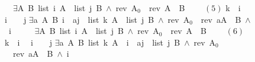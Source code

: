 \documentclass[twoside,runningheads,envcountsame,envcountsect,oribibl,orivec]{llncs}
\begin{document}
\begin{figure}
\begin{isabellebody}
\ \ $\exists$A\ B{\isachardot}\ {\isacharparenleft}list\ {\isacharbackquote}i\ A\ {\isacharasterisk}\ list\ {\isacharbackquote}j\ B{\isacharparenright}\ $\wedge$\ {\isacharparenleft}rev\ A$_0${\isacharparenright}\ {\isacharequal}\ {\isacharparenleft}rev\ A{\isacharparenright}\ {\isacharat}\ B\ {\isasymrbrakk}
\isanewline\ \ \ {\isasymsqsubseteq}\hfill $(5)$\isanewline
{\isacharbackquote}k\ {\isacharcolon}{\isacharequal}\ {\isacharat}{\isacharparenleft}{\isacharbackquote}i\ {\isacharplus}\ {}{\isacharparenright}{\isacharsemicolon}\isanewline
{\isacharat}{\isacharparenleft}{\isacharbackquote}i\ {\isacharplus}\ {}{\isacharparenright}\ {\isacharcolon}{\isacharequal}\ {\isacharbackquote}j{\isacharsemicolon}\isanewline
{\isasymlbrakk}{\isacharparenleft}$\exists$a\ A\ B{\isachardot}\ {\isacharparenleft}{\isacharbackquote}i\ {\isacharbrackleft}{\isasymmapsto}{\isacharbrackright}\ {\isacharbrackleft}a{\isacharcomma}{\isacharbackquote}j{\isacharbrackright}\ {\isacharasterisk}\ list\ {\isacharbackquote}k\ A\ {\isacharasterisk}\ list\ {\isacharbackquote}j\ B{\isacharparenright}\ $\wedge$\ {\isacharparenleft}rev\ A$_0${\isacharparenright}\ {\isacharequal}\ {\isacharparenleft}rev\ {\isacharparenleft}a{\isacharhash}A{\isacharparenright}{\isacharparenright}\ {\isacharat}\ B{\isacharparenright}\ $\wedge$\ {\isacharbackquote}i\ {\isasymnoteq}\ {}{\isacharcomma}\ \isanewline
\ \ $\exists$A\ B{\isachardot}\ {\isacharparenleft}list\ {\isacharbackquote}i\ A\ {\isacharasterisk}\ list\ {\isacharbackquote}j\ B{\isacharparenright}\ $\wedge$\ {\isacharparenleft}rev\ A$_0${\isacharparenright}\ {\isacharequal}\ {\isacharparenleft}rev\ A{\isacharparenright}\ {\isacharat}\ B\ {\isasymrbrakk}
\isanewline\ \ \ {\isasymsqsubseteq}\hfill $(6)$\isanewline
{\isacharbackquote}k\ {\isacharcolon}{\isacharequal}\ {\isacharat}{\isacharparenleft}{\isacharbackquote}i\ {\isacharplus}\ {}{\isacharparenright}{\isacharsemicolon}\isanewline
{\isacharat}{\isacharparenleft}{\isacharbackquote}i\ {\isacharplus}\ {}{\isacharparenright}\ {\isacharcolon}{\isacharequal}\ {\isacharbackquote}j{\isacharsemicolon}\isanewline
{\isasymlbrakk}{\isacharparenleft}$\exists$a\ A\ B{\isachardot}\ {\isacharparenleft}list\ {\isacharbackquote}k\ A\ {\isacharasterisk}\ {\isacharbackquote}i\ {\isacharbrackleft}{\isasymmapsto}{\isacharbrackright}\ {\isacharbrackleft}a{\isacharcomma}{\isacharbackquote}j{\isacharbrackright}\ {\isacharasterisk}\ list\ {\isacharbackquote}j\ B{\isacharparenright}\ $\wedge$\ {\isacharparenleft}rev\ A$_0${\isacharparenright}\ {\isacharequal}\ {\isacharparenleft}rev\ {\isacharparenleft}a{\isacharhash}A{\isacharparenright}{\isacharparenright}\ {\isacharat}\ B{\isacharparenright}\ $\wedge$\ {\isacharbackquote}i\ {\isasymnoteq}\ {}{\isacharcomma}\ \isanewline

\end{isabellebody}
\end{figure}
\end{document}
